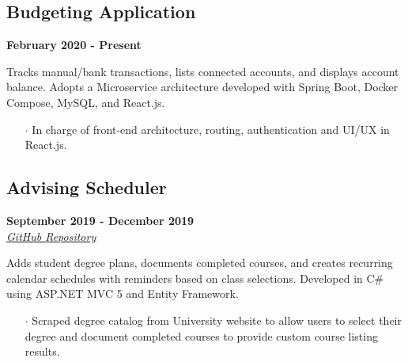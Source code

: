 \documentclass[10pt]{article}
\begin{document}
\begin{paracol}{2}
    \begin{leftcolumn} 
        \sloppy
        \subsection*{Budgeting Application}
        \textbf{February 2020 - Present}
    \end{leftcolumn}
    \begin{rightcolumn} 
        \vspace{.2cm}
        \begin{flushleft} 
            Tracks manual/bank transactions, lists connected accounts, and displays account balance. Adopts a Microservice architecture developed with Spring Boot, Docker Compose, MySQL, and React.js.
        \end{flushleft}
        \vspace{-.6cm}
        \begin{itemize}[leftmargin=.28cm, itemsep=1pt]
            \item[$\cdot$]  In charge of front-end architecture, routing, authentication and UI/UX in React.js.
        \end{itemize}
    \end{rightcolumn}    
\end{paracol}

\vspace{-.4cm}

\begin{paracol}{2}
    \begin{leftcolumn} 
        \sloppy
        \subsection*{Advising Scheduler}
        \textbf{September 2019 - December 2019} \\
        \textit{\href{https://github.com/javiSauce/DBU-Advising-Scheduler}{\underline{GitHub Repository}}}
    \end{leftcolumn}
    \begin{rightcolumn} 
        \vspace{.2cm}
        \begin{flushleft} 
            Adds student degree plans, documents completed courses, and creates recurring calendar schedules with reminders based on class selections. Developed in C\# using ASP.NET MVC 5 and Entity Framework.
        \end{flushleft}
        \vspace{-.6cm}
        \begin{itemize}[leftmargin=.28cm, itemsep=1pt]
            \item[$\cdot$]  Scraped degree catalog from University website to allow users to select their degree and document completed courses to provide custom course listing results.
        \end{itemize}
    \end{rightcolumn}
\end{paracol}
\end{document}
